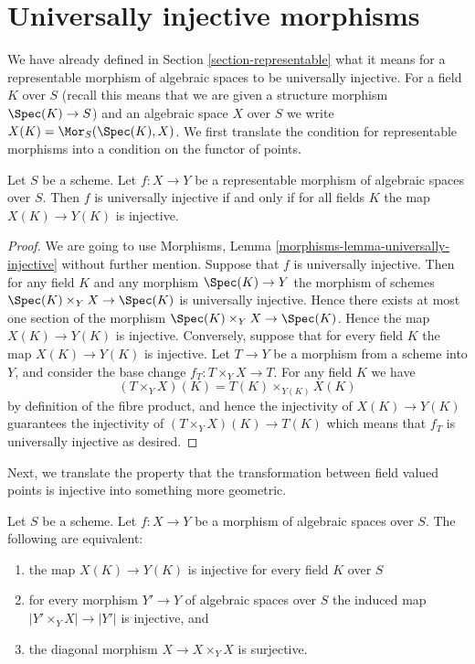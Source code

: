 \section{Universally injective morphisms}
\label{section-universally-injective}

\noindent
We have already defined in Section \ref{section-representable}
what it means for a representable morphism of algebraic spaces
to be universally injective. For a field $K$ over $S$ (recall this means that
we are given a structure morphism $\Spec(K) \to S$) and an
algebraic space $X$ over $S$ we write
$X(K) = \Mor_S(\Spec(K), X)$. We first translate the
condition for representable morphisms into a condition on the functor
of points.

\begin{lemma}
\label{lemma-universally-injective-representable}
Let $S$ be a scheme. Let $f : X \to Y$ be a representable
morphism of algebraic spaces over $S$. Then
$f$ is universally injective if and only if for all fields $K$ the
map $X(K) \to Y(K)$ is injective.
\end{lemma}

\begin{proof}
We are going to use
Morphisms, Lemma \ref{morphisms-lemma-universally-injective}
without further mention.
Suppose that $f$ is universally injective. Then for any field $K$ and any
morphism $\Spec(K) \to Y$ the morphism of schemes
$\Spec(K) \times_Y X \to \Spec(K)$ is universally injective.
Hence there exists at most one section of the morphism
$\Spec(K) \times_Y X \to \Spec(K)$. Hence the map
$X(K) \to Y(K)$ is injective. Conversely, suppose that for every field $K$
the map $X(K) \to Y(K)$ is injective. Let $T \to Y$ be a morphism from a
scheme into $Y$, and consider the base change $f_T : T \times_Y X \to T$.
For any field $K$ we have
$$
(T \times_Y X)(K) = T(K) \times_{Y(K)} X(K)
$$
by definition of the fibre product, and hence the injectivity of
$X(K) \to Y(K)$ guarantees the injectivity of
$(T \times_Y X)(K) \to T(K)$ which means that $f_T$ is universally injective
as desired.
\end{proof}

\noindent
Next, we translate the property that the transformation between field valued
points is injective into something more geometric.

\begin{lemma}
\label{lemma-universally-injective}
Let $S$ be a scheme.
Let $f : X \to Y$ be a morphism of algebraic spaces over $S$.
The following are equivalent:
\begin{enumerate}
\item the map $X(K) \to Y(K)$ is injective for every field $K$ over $S$
\item for every morphism $Y' \to Y$ of algebraic spaces over $S$
the induced map $|Y' \times_Y X| \to |Y'|$ is injective, and
\item the diagonal morphism $X \to X \times_Y X$ is surjective.
\end{enumerate}
\end{lemma}

